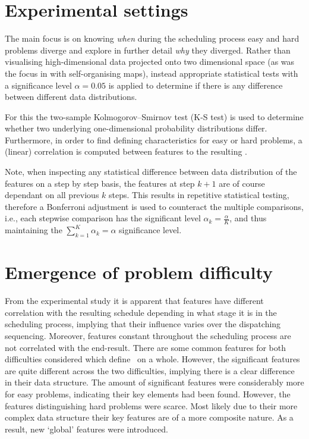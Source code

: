 \section*{Experimental settings}

The main focus is on knowing \emph{when} during the scheduling process easy and 
hard problems diverge and explore in further detail \emph{why} they diverged. 
Rather than visualising high-dimensional data projected onto two dimensional 
space (as was the focus in \cite{SmithMilesLion5} with self-organising maps), 
instead appropriate statistical tests with a significance level $\alpha=0.05$ 
is applied to determine if there is any difference between different data 
distributions. 

For this the two-sample Kolmogorov–Smirnov test (K-S test) is used to determine 
whether two underlying one-dimensional probability distributions differ. 
Furthermore, in order to find defining characteristics for easy or hard 
problems, a (linear) correlation is computed between features to the resulting 
\namerho. 

Note, when inspecting any statistical difference between data distribution of 
the features on a step by step basis, the features at step $k+1$ are of course 
dependant on all previous $k$ steps. This results in repetitive statistical 
testing, therefore a Bonferroni adjustment is used to counteract the multiple 
comparisons, i.e., each stepwise comparison has the significant level 
$\alpha_k=\frac{\alpha}{K}$, and thus maintaining the 
$\sum_{k=1}^K\alpha_k=\alpha$ significance level.

\section{Emergence of problem difficulty}\label{sec:diff:stepwise}

From the experimental study it is apparent that features have different %
correlation with the resulting schedule depending in what stage it is in the 
scheduling process, implying that their influence varies over the dispatching 
sequencing. Moreover, features constant throughout the scheduling process are 
not correlated with the end-result.
There are some common features for both difficulties considered which define 
\jsp\ on a whole. However, the significant features are quite different across 
the two difficulties, implying there is a clear difference in their data 
structure. The amount of significant features were considerably more for easy 
problems, indicating their key elements had been found. However, the features 
distinguishing hard problems were scarce. Most likely due to their more complex 
data structure their key features are of a more composite nature. As a result, 
new `global' features were introduced. 


